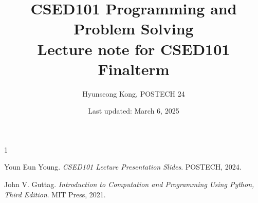 \documentclass[letterpaper, 12pt]{article}
\newcommand{\1}{\mathds{1}}	%
\theoremstyle{definition}
\begin{document}

\title{CSED101 Programming and Problem Solving \\[1em]
\normalsize Lecture note for CSED101 Finalterm}


\author{\normalsize Hyunseong Kong, POSTECH 24}
\date{\normalsize\vspace{-1ex} Last updated: March 6, 2025}


\maketitle
\tableofcontents\label{sec:contents}


\setcounter{section}{-1}










\begin{thebibliography}{1}

   Youn Eun Young.
   \textit{CSED101 Lecture Presentation Slides}.
   POSTECH, 2024.

   John V. Guttag.
   \textit{Introduction to Computation and Programming Using Python, Third Edition}.
   MIT Press, 2021.


\end{thebibliography}

\end{document}
